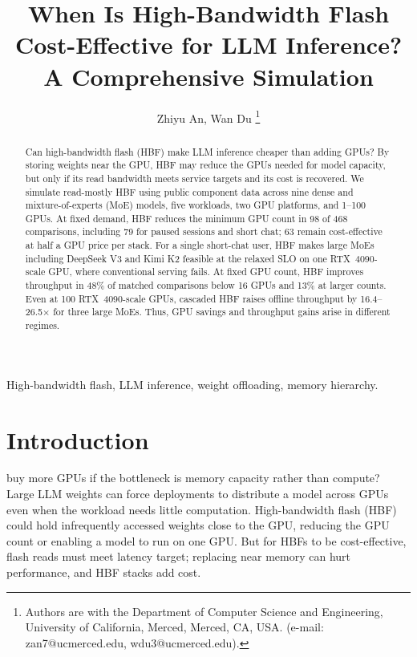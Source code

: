 \documentclass[lettersize,journal]{IEEEtran}
\begin{document}
\title{When Is High-Bandwidth Flash Cost-Effective for LLM Inference? A Comprehensive Simulation}
\author{Zhiyu An, Wan Du
\thanks{Authors are with the Department of Computer Science and Engineering,
University of California, Merced, Merced, CA, USA.
(e-mail: zan7@ucmerced.edu, wdu3@ucmerced.edu).}%
}
\maketitle

\begin{abstract}
Can high-bandwidth flash (HBF) make LLM inference cheaper than adding GPUs? By storing weights near the GPU, HBF may reduce the GPUs needed for model capacity, but only if its read bandwidth meets service targets and its cost is recovered. We simulate read-mostly HBF using public component data across nine dense and mixture-of-experts (MoE) models, five workloads, two GPU platforms, and 1--100 GPUs. At fixed demand, HBF reduces the minimum GPU count in 98 of 468 comparisons, including 79 for paused sessions and short chat; 63 remain cost-effective at half a GPU price per stack. For a single short-chat user, HBF makes large MoEs including DeepSeek V3 and Kimi K2 feasible at the relaxed SLO on one RTX~4090-scale GPU, where conventional serving fails. At fixed GPU count, HBF improves throughput in 48\% of matched comparisons below 16 GPUs and 13\% at larger counts. Even at 100 RTX~4090-scale GPUs, cascaded HBF raises offline throughput by 16.4--26.5$\times$ for three large MoEs. Thus, GPU savings and throughput gains arise in different regimes.

\end{abstract}
\begin{IEEEkeywords}
High-bandwidth flash, LLM inference, weight offloading, memory hierarchy.
\end{IEEEkeywords}

\section{Introduction}
 buy more GPUs if the bottleneck is memory capacity rather than compute? Large LLM weights can force deployments to distribute a model across GPUs even when the workload needs little computation. High-bandwidth flash (HBF) could hold infrequently accessed weights close to the GPU, reducing the GPU count or enabling a model to run on one GPU. But for HBFs to be cost-effective, flash reads must meet latency target; replacing near memory can hurt performance, and HBF stacks add cost.
\end{document}
